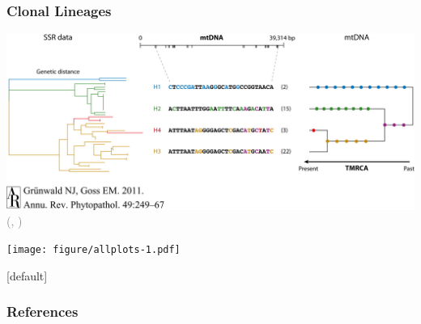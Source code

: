 \documentclass{beamer}\usepackage[]{graphicx}\usepackage[]{color}
\newcommand{\mycitep}[1]{\scriptsize{\textcolor{gray}{(\citeauthor{#1}, \citeyear{#1})}}}
\begin{document}
\appendix


\begin{frame}
	\begin{center}
	\frametitle{Clonal Lineages}
	\includegraphics[keepaspectratio, width=\textwidth]{../lineages.jpeg}
	\newline
	\mycitep{grunwald2011evolution}
	\end{center}
\end{frame}



{\texttt{[image: figure/allplots-1.pdf]}}

\begin{frame}[t, allowpagebreak]
\end{frame}

[default]

\begin{frame}[t]
	\frametitle{References}

	\printbibliography
\end{frame}
\end{document}
